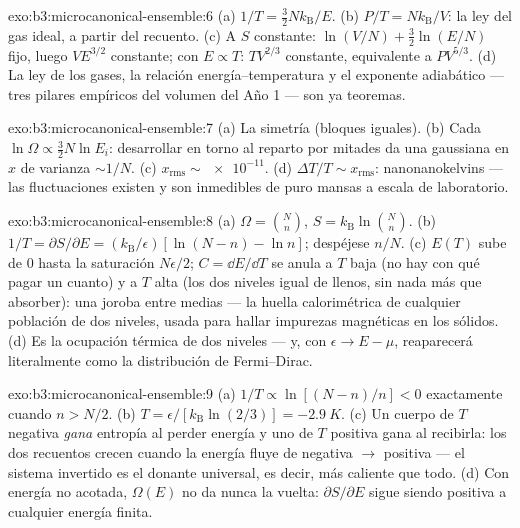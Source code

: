 \begin{solution}{exo:b3:microcanonical-ensemble:6}
(a) $1/T = \tfrac32 Nk_{\text{B}}/E$. (b) $P/T =
Nk_{\text{B}}/V$: la ley del gas ideal, a partir del recuento. (c) A $S$
constante: $\ln(V/N) + \tfrac32\ln(E/N)$ fijo, luego $VE^{3/2}$ constante;
con $E \propto T$: $TV^{2/3}$ constante, equivalente a
$PV^{5/3}$. (d) La ley de los gases, la relación energía--temperatura y
el exponente adiabático --- tres pilares empíricos del volumen del Año 1 ---
son ya teoremas.
\end{solution}

\begin{solution}{exo:b3:microcanonical-ensemble:7}
(a) La simetría (bloques iguales). (b) Cada $\ln\Omega \propto
\tfrac32 N\ln E_i$: desarrollar en torno al reparto por mitades da una
gaussiana en $x$ de varianza $\sim1/N$. (c) $x_{\text{rms}} \sim
\num{e-11}$. (d) $\Delta T/T \sim x_{\text{rms}}$:
nanonanokelvins --- las fluctuaciones existen y son inmedibles de puro
mansas a escala de laboratorio.
\end{solution}

\begin{solution}{exo:b3:microcanonical-ensemble:8}
(a) $\Omega = \binom Nn$, $S = k_{\text{B}}\ln\binom Nn$. (b)
$1/T = \partial S/\partial E = (k_{\text{B}}/\epsilon)[\ln(N-n) -
\ln n]$; despéjese $n/N$. (c) $E(T)$ sube de $0$ hasta la
saturación $N\epsilon/2$; $C = \dd E/\dd T$ se anula a $T$ baja
(no hay con qué pagar un cuanto) y a $T$ alta (los dos niveles igual de
llenos, sin nada más que absorber): una joroba entre medias --- la huella
calorimétrica de cualquier población de dos niveles, usada para hallar
impurezas magnéticas en los sólidos. (d) Es la ocupación térmica de dos
niveles --- y, con $\epsilon \to E - \mu$, reaparecerá literalmente como
la distribución de Fermi--Dirac.
\end{solution}

\begin{solution}{exo:b3:microcanonical-ensemble:9}
(a) $1/T \propto \ln[(N-n)/n] < 0$ exactamente cuando $n > N/2$. (b)
$T = \epsilon/[k_{\text{B}}\ln(2/3)] = -\qty{2.9}{K}$. (c) Un
cuerpo de $T$ negativa \emph{gana} entropía al perder energía y uno de
$T$ positiva gana al recibirla: los dos recuentos crecen cuando la energía
fluye de negativa $\to$ positiva --- el sistema invertido es el
donante universal, es decir, más caliente que todo. (d) Con energía no
acotada, $\Omega(E)$ no da nunca la vuelta: $\partial S/\partial E$
sigue siendo positiva a cualquier energía finita.
\end{solution}

